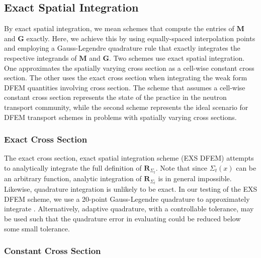 \subsection{Exact Spatial Integration}

By exact spatial integration, we mean schemes that compute the entries of  $\mathbf{M}$ and $\mathbf{G}$ exactly. 
Here, we achieve this by using equally-spaced interpolation points and employing a Gauss-Legendre quadrature rule  \cite{abramowitz} that exactly integrates the respective integrands of $\mathbf{M}$ and $\mathbf{G}$.
Two schemes use exact spatial integration.  
One approximates the spatially varying cross section as a cell-wise constant cross section.
The other uses the exact cross section when integrating the weak form DFEM quantities involving cross section.  
The scheme that assumes a cell-wise constant cross section represents the state of the practice in the neutron transport community, while the second scheme represents the ideal scenario for DFEM transport schemes in problems with spatially varying cross sections.

\subsubsection{Exact Cross Section}

The exact cross section, exact spatial integration scheme (EXS DFEM) attempts to analytically integrate the full definition of  $\mathbf{R}_{\Sigma_t}$.
Note that since $\Sigma_t(x)$ can be an arbitrary function, analytic integration of $\mathbf{R}_{\Sigma_t}$ is in general impossible.  Likewise, quadrature integration is unlikely to be exact.
In our testing of the EXS DFEM scheme, we use a 20-point Gauss-Legendre quadrature to approximately integrate .  
Alternatively, adaptive quadrature, with a controllable tolerance, may be used such that the quadrature error in evaluating  could be reduced below some small tolerance.    

\subsubsection{Constant Cross Section}

